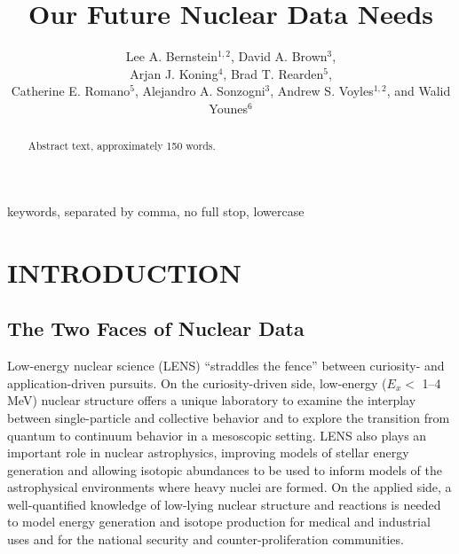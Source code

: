 \documentclass[letterpaper]{ar-1col}
\begin{document}

\title{Our Future Nuclear Data Needs}


\author{Lee A. Bernstein$^{1,2}$, David A. Brown$^3$, \\Arjan J. Koning$^4$, Brad T. Rearden$^5$,  \\Catherine E. Romano$^5$, Alejandro A. Sonzogni$^3$, Andrew S. Voyles$^{1,2}$, and Walid  Younes$^6$
}

\begin{abstract}
Abstract text, approximately 150 words. 
\end{abstract}

\begin{keywords}
keywords, separated by comma, no full stop, lowercase
\end{keywords}
\maketitle

\tableofcontents


\section{INTRODUCTION}

\subsection{The Two Faces of Nuclear Data}


Low-energy nuclear science (LENS) \enquote{straddles the fence} between curiosity- and application-driven pursuits.  On the curiosity-driven side, low-energy ($E_x <$ 1--4 MeV) nuclear structure offers a unique laboratory to examine the interplay between single-particle and collective behavior and to explore the transition from quantum to continuum behavior in a mesoscopic setting. LENS also plays an important role in nuclear astrophysics, improving models of stellar energy generation and allowing isotopic abundances to be used to inform models of the astrophysical environments where heavy nuclei are formed.  On the applied side, a well-quantified knowledge of low-lying nuclear structure and reactions is needed to model energy generation and isotope production for medical and industrial uses and for the national security and counter-proliferation communities.   
\end{document}
